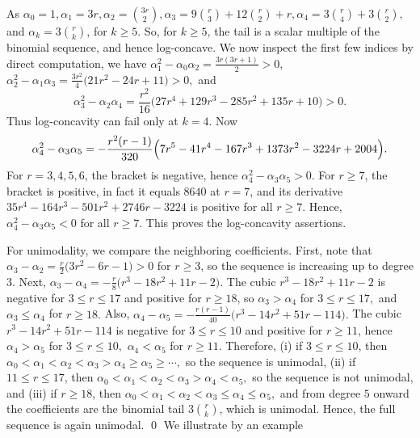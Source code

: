 \documentclass[12pt,twoside]{article}
\renewenvironment{proof}{{\noindent\bfseries Proof.}}{\qed}
\begin{document}
		\begin{proof}
			As $
			\alpha_0=1, \alpha_1=3r,  \alpha_2=\binom{3r}{2}, \alpha_3=9\binom{r}{3}+12\binom{r}{2}+r,		\alpha_4=3\binom{r}{4}+3\binom{r}{2}, $	and	$\alpha_k=3\binom{r}{k}$, for $k\geq 5.$ So, for $k\ge 5$, the tail is a scalar multiple of the binomial sequence, and hence log-concave. We now inspect the first few indices by direct computation, we have $\alpha_1^2-\alpha_0\alpha_2=\tfrac{3r(3r+1)}{2}>0,$ $\alpha_2^2-\alpha_1\alpha_3
			=	\tfrac{3r^2}{4}\bigl(21r^2-24r+11\bigr)>0,$ 	and
			$$
			\alpha_3^2-\alpha_2\alpha_4
			=
			\frac{r^2}{16}\bigl(27r^4+129r^3-285r^2+135r+10\bigr)>0.
			$$
			Thus log-concavity can fail only at $k=4$. Now
			$$
			\alpha_4^2-\alpha_3\alpha_5
			=
			-\frac{r^2(r-1)}{320}
			\Bigl(7r^5-41r^4-167r^3+1373r^2-3224r+2004\Bigr).
			$$
			For $r=3,4,5,6$, the bracket is negative, hence $\alpha_4^2-\alpha_3\alpha_5>0$. For $r\ge 7$, the bracket is positive, in fact  it equals $8640$ at $r=7$, and its derivative $35r^4-164r^3-501r^2+2746r-3224$ is positive for all $r\ge 7$. Hence, $\alpha_4^2-\alpha_3\alpha_5<0$ for all $r\ge 7$. This proves the log-concavity assertions.
			
			For unimodality, we compare the neighboring coefficients. First, note that $\alpha_3-\alpha_2=\tfrac{r}{2}\bigl(3r^2-6r-1\bigr)>0$ for $r\ge 3$, so the sequence is increasing up to degree $3$.
			 Next, $	\alpha_3-\alpha_4=-\tfrac{r}{8}\bigl(r^3-18r^2+11r-2\bigr).$ The cubic $r^3-18r^2+11r-2$ is negative for $3\le r\le 17$ and positive for $r\ge 18$, so $\alpha_3>\alpha_4$ for  $3\le r\le 17,$ and $\alpha_3\le \alpha_4$ for $r\ge 18.$			
			Also, $\alpha_4-\alpha_5=-\tfrac{r(r-1)}{40}\bigl(r^3-14r^2+51r-114\bigr).$ The cubic $r^3-14r^2+51r-114$ is negative for $3\le r\le 10$ and positive for $r\ge 11$, hence $\alpha_4>\alpha_5$ for $3\le r\le 10,$ $\alpha_4<\alpha_5$  for $r\ge 11.$ 	
			Therefore, (i)   if $3\le r\le 10$, then $\alpha_0<\alpha_1<\alpha_2<\alpha_3>\alpha_4\ge \alpha_5\ge \cdots,$ 	so the sequence is unimodal, (ii)  if $11\le r\le 17$, then $\alpha_0<\alpha_1<\alpha_2<\alpha_3>\alpha_4<\alpha_5,$	so the sequence is not unimodal, and (iii)   if $r\ge 18$, then $\alpha_0<\alpha_1<\alpha_2<\alpha_3\le \alpha_4\le \alpha_5, $	and from degree $5$ onward the coefficients are the binomial tail $3\binom{r}{k}$, which is unimodal. Hence, the full sequence is again unimodal.
		\end{proof}
		We illustrate by an example
\end{document}
